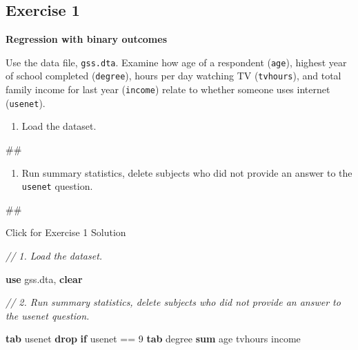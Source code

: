 \documentclass[
]{book}
\newenvironment{Shaded}{\begin{snugshade}}{\end{snugshade}}
\newcommand{\CommentTok}[1]{\textcolor[rgb]{0.56,0.35,0.01}{\textit{#1}}}
\newcommand{\KeywordTok}[1]{\textcolor[rgb]{0.13,0.29,0.53}{\textbf{#1}}}
\newcommand{\NormalTok}[1]{#1}
\providecommand{\tightlist}{%
  \setlength{\itemsep}{0pt}\setlength{\parskip}{0pt}}
\begin{document}
\hypertarget{exercise-1-8}{%
\subsection{Exercise 1}\label{exercise-1-8}}

\textbf{Regression with binary outcomes}

Use the data file, \texttt{gss.dta}. Examine how age of a respondent (\texttt{age}), highest year of school completed (\texttt{degree}), hours per day watching TV (\texttt{tvhours}), and total family income for last year (\texttt{income}) relate to whether someone uses internet (\texttt{usenet}).

\begin{enumerate}
\def\labelenumi{\arabic{enumi}.}
\tightlist
\item
  Load the dataset.
\end{enumerate}

\begin{Shaded}
\begin{Highlighting}[]
\NormalTok{\#\#}
\end{Highlighting}
\end{Shaded}

\begin{enumerate}
\def\labelenumi{\arabic{enumi}.}
\setcounter{enumi}{1}
\tightlist
\item
  Run summary statistics, delete subjects who did not provide an answer to the \texttt{usenet} question.
\end{enumerate}

\begin{Shaded}
\begin{Highlighting}[]
\NormalTok{\#\#}
\end{Highlighting}
\end{Shaded}

{Click for Exercise 1 Solution}

\begin{alert}

\begin{Shaded}
\begin{Highlighting}[]
\CommentTok{// 1.  Load the dataset. }

\KeywordTok{use}\NormalTok{ gss.dta, }\KeywordTok{clear} 

\CommentTok{// 2.  Run summary statistics, delete subjects who did not provide an answer to the \textasciigrave{}usenet\textasciigrave{} question.}

\KeywordTok{tab}\NormalTok{ usenet }
\KeywordTok{drop} \KeywordTok{if}\NormalTok{ usenet == 9}
\KeywordTok{tab}\NormalTok{ degree }
\KeywordTok{sum}\NormalTok{ age tvhours income }
\end{Highlighting}
\end{Shaded}

\end{alert}
\end{document}
